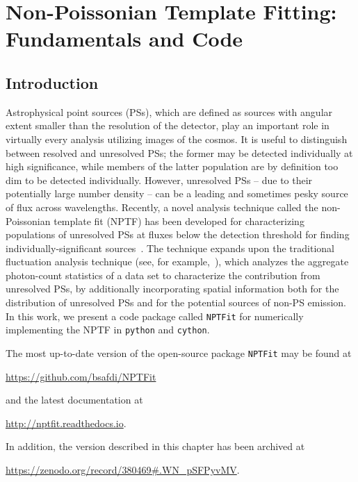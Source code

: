 \chapter{Non-Poissonian Template Fitting: Fundamentals and Code}
\label{ch:nptfit}

\section{Introduction}

Astrophysical point sources (PSs), which are defined as sources with angular extent smaller than the resolution of the detector, play an important role in virtually every analysis utilizing images of the cosmos.  It is useful to distinguish between resolved and unresolved PSs; the former may be detected individually at high significance, while members of the latter population are by definition too dim to be detected individually.  However, unresolved PSs -- due to their potentially large number density -- can be a leading and sometimes pesky source of flux across wavelengths.
  Recently, a novel analysis technique called the non-Poissonian template fit (NPTF) has been developed for characterizing populations of unresolved PSs at fluxes below the detection threshold for finding individually-significant sources~\cite{Lee:2014mza,Lee:2015fea}.  The technique expands upon the traditional fluctuation analysis technique (see, for example,~\cite{Miyaji:2001dp,Malyshev:2011zi}), which analyzes the aggregate photon-count statistics of a data set to characterize the contribution from unresolved PSs, by additionally incorporating spatial information both for the distribution of unresolved PSs and for the potential sources of non-PS emission.  In this work, we present a code package called \texttt{NPTFit} for numerically implementing the NPTF in \texttt{python} and \texttt{cython}.
  
The most up-to-date version of the open-source package \texttt{NPTFit} may be found at
\begin{center}
\url{https://github.com/bsafdi/NPTFit}
\end{center}
and the latest documentation at
\begin{center}
\url{http://nptfit.readthedocs.io}.
\end{center}
In addition, the version described in this chapter has been archived at
\begin{center}
\url{https://zenodo.org/record/380469#.WN_pSFPyvMV}.
\end{center}


